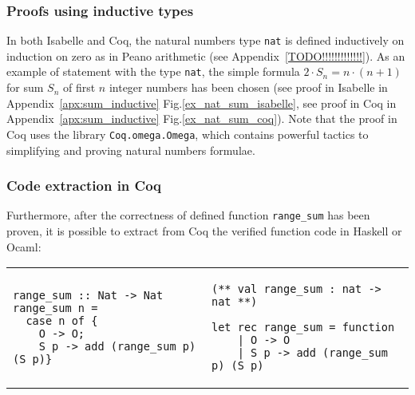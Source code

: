\documentclass[article]{aaltoseries}
\begin{document}



\subsubsection{Proofs using inductive types}

In both Isabelle and Coq, the natural numbers type \texttt{nat} is defined inductively on induction on zero as in Peano arithmetic (see Appendix~\ref{TODO!!!!!!!!!!!!!}). As an example of statement with the type \texttt{nat}, the simple formula 
$2 \cdot S_{n} = {n \cdot (n + 1)}$ for sum $S_{n}$ of first $n$ integer numbers has been chosen (see proof in Isabelle in Appendix~\ref{apx:sum_inductive} Fig.\ref{ex_nat_sum_isabelle}, see proof in Coq in Appendix~\ref{apx:sum_inductive} Fig.\ref{ex_nat_sum_coq}). Note that the proof in Coq uses the library \texttt{Coq.omega.Omega}, which contains powerful tactics to simplifying and proving natural numbers formulae.


\subsubsection{Code extraction in Coq}
Furthermore, after the correctness of defined function \texttt{range\_sum} has been proven, it is possible to extract from Coq the verified function code in Haskell or Ocaml:

\begin{raggedleft}
\begin{tabular}{p{} p{}}
\begin{lstlisting}[caption={Extracted function in Haskell}]
range_sum :: Nat -> Nat
range_sum n =
  case n of {
    O -> O;
    S p -> add (range_sum p) (S p)}
\end{lstlisting} %
&
\begin{lstlisting}[caption={Extracted function in OCaml}]
(** val range_sum : nat -> nat **)

let rec range_sum = function
    | O -> O
    | S p -> add (range_sum p) (S p)
\end{lstlisting}
\end{tabular}
\end{raggedleft}

\end{document}
